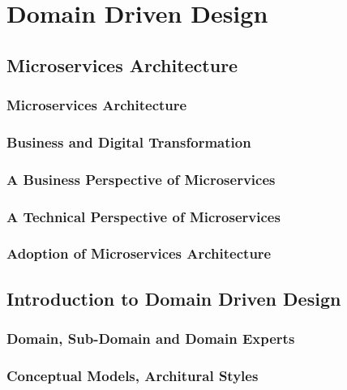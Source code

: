\documentclass[a4paper, 11pt]{book}
\begin{document}
    \part{Domain Driven Design}


    \chapter{Microservices Architecture}


    \section{Microservices Architecture}


    \section{Business and Digital Transformation}


    \section{A Business Perspective of Microservices}


    \section{A Technical Perspective of Microservices}


    \section{Adoption of Microservices Architecture}


    \chapter{Introduction to Domain Driven Design}


    \section{Domain, Sub-Domain and Domain Experts}


    \section{Conceptual Models, Architural Styles}
\end{document}
